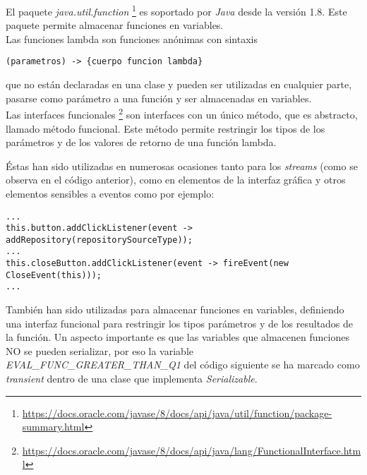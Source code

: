 El paquete \textit{java.util.function} \footnote{\url{https://docs.oracle.com/javase/8/docs/api/java/util/function/package-summary.html}} es soportado por \textit{Java} desde la versión 1.8. Este paquete permite almacenar funciones en variables. 
\\Las funciones lambda son funciones anónimas con sintaxis \\
\begin{minipage}{\linewidth}
{\tiny
\begin{verbatim}
(parametros) -> {cuerpo funcion lambda}
\end{verbatim}
}
\end{minipage}
que no están declaradas en una clase y pueden ser utilizadas en cualquier parte, pasarse como parámetro a una función y ser almacenadas en variables.
\\Las interfaces funcionales \footnote{\url{https://docs.oracle.com/javase/8/docs/api/java/lang/FunctionalInterface.html}} son interfaces con un único método, que es abstracto, llamado método funcional. Este método permite restringir los tipos de los parámetros y de los valores de retorno de una función lambda.

Éstas han sido utilizadas en numerosas ocasiones tanto para los \textit{streams} (como se observa en el código anterior), como en elementos de la interfaz gráfica y otros elementos sensibles a eventos como por ejemplo:\\

\begin{minipage}{\linewidth}
{\tiny
\begin{verbatim}
...
this.button.addClickListener(event -> addRepository(repositorySourceType));
...
this.closeButton.addClickListener(event -> fireEvent(new CloseEvent(this)));
...
\end{verbatim}
}
\end{minipage}

También han sido utilizadas para almacenar funciones en variables, definiendo una interfaz funcional para restringir los tipos parámetros y de los resultados de la función. Un aspecto importante es que las variables que almacenen funciones NO se pueden serializar, por eso la variable \textit{EVAL\_FUNC\_GREATER\_THAN\_Q1} del código siguiente se ha marcado como \textit{transient} dentro de una clase que implementa \textit{Serializable}.

